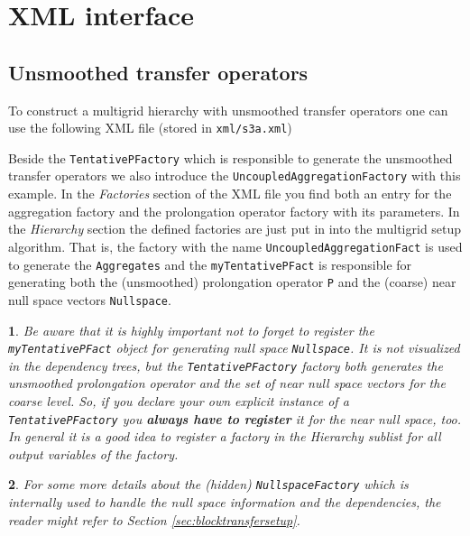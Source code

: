 \documentclass[10pt,fleqn]{book}
\newtheorem*{mycomment}{\ding{42}}
\begin{document}
\section{XML interface}

\subsection{Unsmoothed transfer operators}
To construct a multigrid hierarchy with unsmoothed transfer operators one can use the following XML file (stored in \texttt{xml/s3a.xml})



Beside the \verb|TentativePFactory| which is responsible to generate the unsmoothed transfer operators we also introduce the \verb|UncoupledAggregationFactory| with this example. In the \textit{Factories} section of the XML file you find both an entry for the aggregation factory and the prolongation operator factory with its parameters. In the \textit{Hierarchy} section the defined factories are just put in into the multigrid setup algorithm. That is, the factory with the name \verb|UncoupledAggregationFact| is used to generate the \verb|Aggregates| and the \verb|myTentativePFact| is responsible for generating both the (unsmoothed) prolongation operator \verb|P| and the (coarse) near null space vectors \verb|Nullspace|.\\

\begin{mycomment}
Be aware that it is highly important not to forget to register the \verb|myTentativePFact| object for generating null space \verb|Nullspace|. It is not visualized in the dependency trees, but the \verb|TentativePFactory| factory both generates the unsmoothed prolongation operator and the set of near null space vectors for the coarse level. So, if you declare your own explicit instance of a \verb|TentativePFactory| you \textbf{always have to register} it for the near null space, too. In general it is a good idea to register a factory in the \textit{Hierarchy} sublist for all output variables of the factory.
\end{mycomment}

\begin{mycomment}
For some more details about the (hidden) \texttt{NullspaceFactory} which is internally used to handle the null space information and the dependencies, the reader might refer to Section \ref{sec:blocktransfersetup}.
\end{mycomment}
\end{document}
